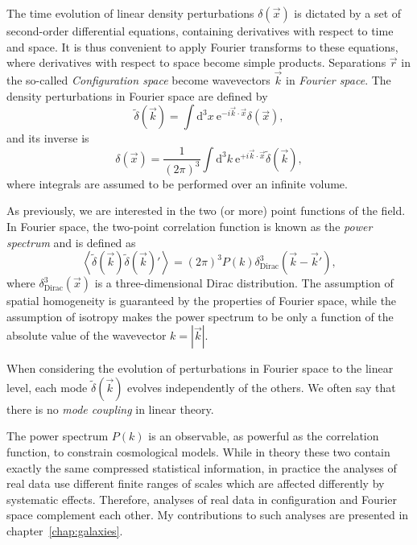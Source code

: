     The time evolution of linear density perturbations $\delta(\vec{x})$ 
    is dictated by a set of second-order differential equations, containing 
    derivatives with respect to time and space. 
    It is thus convenient to apply Fourier
    transforms to these equations, where derivatives with respect to space 
    become simple products. Separations $\vec{r}$ in the so-called 
    \emph{Configuration space} become wavevectors $\vec{k}$ in 
    \emph{Fourier space}. The density perturbations in Fourier space are
    defined by 
    \begin{equation}
        \tilde{\delta}(\vec{k}) = \int \mathrm{d}^3x \ \mathrm{e}^{- i \vec{k}\cdot\vec{x}} \delta(\vec{x}),
    \end{equation}
    and its inverse is
    \begin{equation}
        \delta(\vec{x}) = \frac{1}{(2\pi)^3}\int \mathrm{d}^3k \ \mathrm{e}^{+i \vec{k}\cdot\vec{x}} \tilde\delta(\vec{k}),
    \end{equation}
    where integrals are assumed to be performed over an infinite volume. 

    As previously, we are interested in the two (or more) point functions of the
    field. In Fourier space, the two-point correlation function is known as the
    \emph{power spectrum} and is defined as
    \begin{equation}
        \left\langle \tilde\delta(\vec{k}) \tilde\delta(\vec{k})' \right\rangle = (2\pi)^3 P(k) \delta^3_\mathrm{Dirac}(\vec{k}-\vec{k}'),
        \label{eq:power_spectrum_definition}
    \end{equation}
    where $\delta^3_\mathrm{Dirac}(\vec{x})$ is a three-dimensional Dirac distribution.
    The assumption of spatial homogeneity is guaranteed by the properties of Fourier space,
    while the assumption of isotropy makes the power spectrum to be only a function of the
    absolute value of the wavevector $k = |\vec{k}|$. 

    When considering the evolution of perturbations in Fourier space to the linear level,
    each mode $\tilde\delta(\vec{k})$ evolves independently of the others. We often say 
    that there is no \emph{mode coupling} in linear theory. 

    The power spectrum $P(k)$ is an observable, as powerful as the correlation function,
    to constrain cosmological models. While in theory these two contain exactly the
    same compressed statistical information, in practice the analyses of real data  
    use different finite ranges of scales which are affected differently by systematic effects. 
    Therefore, analyses of real data in configuration and Fourier space complement each other. 
    My contributions to such analyses are presented in chapter~\ref{chap:galaxies}. 

